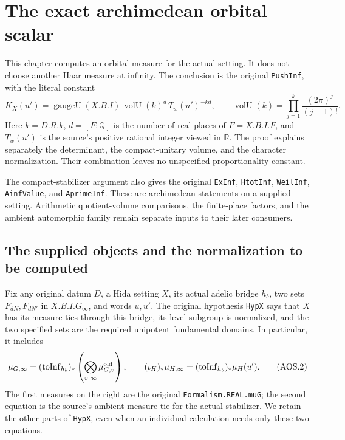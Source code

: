 \section{The exact archimedean orbital scalar}
\label{sec:archimedean-orbital-scalar-v54}

This chapter computes an orbital measure for the actual setting.  It
does not choose another Haar measure at infinity.  The conclusion is
the original \texttt{PushInf}, with the literal constant
\[
 K_X(u')=\operatorname{gaugeU}(X.B.I)\,
       \operatorname{volU}(k)^d\,T_w(u')^{-kd},
 \qquad
 \operatorname{volU}(k)=\prod_{j=1}^{k}\frac{(2\pi)^j}{(j-1)!}.
 \tag{AOS.1}
\]
Here $k=D.R.k$, $d=[F:\mathbb Q]$ is the number of real places of
$F=X.B.I.F$, and $T_w(u')$ is the source's positive rational integer
viewed in $\mathbb R$.  The proof explains separately the determinant,
the compact-unitary volume, and the character normalization.  Their
combination leaves no unspecified proportionality constant.

The compact-stabilizer argument also gives the original
\texttt{ExInf}, \texttt{HtotInf}, \texttt{WeilInf},
\texttt{AinfValue}, and \texttt{AprimeInf}.  These are archimedean
statements on a supplied setting.  Arithmetic quotient-volume
comparisons, the finite-place factors, and the ambient automorphic
family remain separate inputs to their later consumers.

\subsection{The supplied objects and the normalization to be computed}

Fix any original datum $D$, a Hida setting $X$, its actual adelic bridge
$h_b$, two sets $F_{dN},F_{dN'}$ in $X.B.I.G_\infty$, and words
$u,u'$.  The original hypothesis \texttt{HypX} says that $X$ has its
measure ties through this bridge, its level subgroup is normalized,
and the two specified sets are the required unipotent fundamental
domains.  In particular, it includes
\[
 \mu_{G,\infty}
   =(\operatorname{toInf}_{h_b})_*
           \left(\bigotimes_{v\mid\infty}\mu_{G,v}^{\rm old}\right),
 \qquad
 (\iota_H)_*\mu_{H,\infty}
    =(\operatorname{toInf}_{h_b})_*\mu_H(u').
 \tag{AOS.2}
\]
The first measures on the right are the original
\texttt{Formalism.REAL.muG}; the second equation is the source's
ambient-measure tie for the actual stabilizer.  We retain the other
parts of \texttt{HypX}, even when an individual calculation needs only
these two equations.

